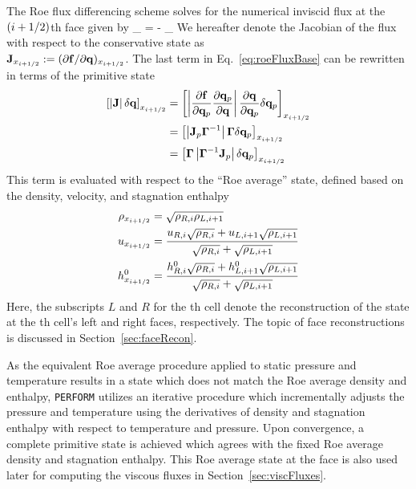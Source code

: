 The Roe flux differencing scheme solves for the numerical inviscid flux at the $(i+1/2)$th face given by
\be\label{eq:roeFluxBase}
    \widetilde{\fluxVec}_{\faceXRight} =   -  \left[ \left\vert \pde{\fluxVec}{\consVec} \right\vert \delta \consVec \right]_{\faceXRight}
\ee
We hereafter denote the Jacobian of the flux with respect to the conservative state as \\$\mathbf{J}_{x_{i+1/2}} := (\partial \mathbf{f} / \partial \mathbf{q})_{x_{i+1/2}}$. The last term in Eq.~\ref{eq:roeFluxBase} can be rewritten in terms of the primitive state
\begin{align}
    \left[ \left\vert \mathbf{J} \right\vert \delta \mathbf{q} \right]_{x_{i+1/2}} &= \left[ \left\vert \frac{\partial \mathbf{f}}{\partial \mathbf{q}_p} \frac{\partial \mathbf{q}_p}{\partial \mathbf{q}} \right\vert \frac{\partial \mathbf{q}}{\partial \mathbf{q}_p} \delta \mathbf{q}_p \right]_{x_{i+1/2}} \\
    &= \left[ \left\vert \mathbf{J}_p \boldsymbol{\Gamma}^{-1} \right\vert \boldsymbol{\Gamma} \delta \mathbf{q}_p \right]_{x_{i+1/2}} \\
    &= \left[ \boldsymbol{\Gamma} \left\vert \boldsymbol{\Gamma}^{-1} \mathbf{J}_p \right\vert \delta \mathbf{q}_p \right]_{x_{i+1/2}}
\end{align}
This term is evaluated with respect to the ``Roe average'' state, defined based on the density, velocity, and stagnation enthalpy
\begin{align}
    \rho_{x_{i+1/2}} &= \sqrt{\rho_{R,i} \rho_{L,i+1}} \\
    u_{x_{i+1/2}} &= \frac{u_{R,i} \sqrt{\rho_{R,i}} + u_{L,i+1} \sqrt{\rho_{L,i+1}}}{\sqrt{\rho_{R,i}} + \sqrt{\rho_{L,i+1}}}\\
    h^0_{x_{i+1/2}} &= \frac{h^0_{R,i} \sqrt{\rho_{R,i}} + h^0_{L,i+1} \sqrt{\rho_{L,i+1}}}{\sqrt{\rho_{R,i}} + \sqrt{\rho_{L,i+1}}}
\end{align}
Here, the subscripts $L$ and $R$ for the \coordIdx th cell denote the reconstruction of the state at the \coordIdx th cell's left and right faces, respectively. The topic of face reconstructions is discussed in Section~\ref{sec:faceRecon}.

As the equivalent Roe average procedure applied to static pressure and temperature results in a state which does not match the Roe average density and enthalpy, \verb|PERFORM| utilizes an iterative procedure which incrementally adjusts the pressure and temperature using the derivatives of density and stagnation enthalpy with respect to temperature and pressure. Upon convergence, a complete primitive state is achieved which agrees with the fixed Roe average density and stagnation enthalpy. This Roe average state at the face is also used later for computing the viscous fluxes in Section~\ref{sec:viscFluxes}.

